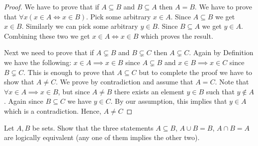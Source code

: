 \documentclass[12pt]{article}
\theoremstyle{remark}
\newcommand{\exercise}[1]{\noindent {\bf Exercise #1.}}
\newenvironment{ques}[1][]{%
	\begin{mdframed}[style=mdblackbox]
		\exercise{#1}
}{%
\end{mdframed}
}
\begin{document}
\begin{proof}
    We have to prove that if $ A \subseteq B $ and $ B \subseteq A $ then $ A = B $. We have to prove that $ \forall x (x \in A \iff x \in B ) $. Pick some arbitrary $ x \in A $. Since $ A \subseteq B $ we get $ x \in B $. Similarly we can pick some arbitrary $ y \in B $. Since $ B \subseteq A $ we get $ y \in A $. Combining these two we get $ x \in A \iff x \in B $ which proves the result.\par
    Next we need to prove that if $ A \subsetneq B $ and $ B \subsetneq C $ then $ A \subsetneq C $. Again by Definition we have the following: $ x \in A \implies x \in B $ since $ A \subsetneq B $ and $ x \in B \implies x \in C $ since $ B \subsetneq C $. This is enough to prove that $ A \subseteq C $ but to complete the proof we have to show that $ A \neq C $. 
    We prove by contradiction and assume that $ A = C $. Note that $ \forall x \in A \implies x \in B $, but since $ A \neq B $ there exists an element $ y \in B $ such that $ y \notin A $. Again since $ B \subseteq C $ we have $ y \in C $. By our assumption, this implies that $ y \in A $ which is a contradiction. Hence, $ A \neq C $
\end{proof}

\begin{ques}[3.1.5]
    Let $ A, B $ be sets. Show that the three statements $ A \subseteq B $, $ A \cup B = B $, $ A \cap B = A $ are logically equivalent (any one of them implies the other two).
\end{ques}
\end{document}
